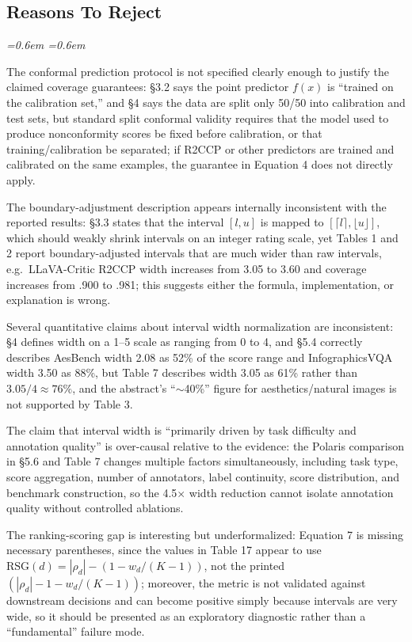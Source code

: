 \documentclass[10pt]{article}
\newenvironment{reviewerquote}{%
  \par\addvspace{0.25ex}\begingroup
  \footnotesize\itshape
  \leftskip=0.6em \rightskip=0.6em
  \color{black!78}
  \setlength{\parskip}{0.35ex plus 0.1ex}
}{%
  \endgroup\par\addvspace{0.25ex}
}
\begin{document}
\subsection*{Reasons To Reject}
\begin{reviewerquote}
The conformal prediction protocol is not specified clearly enough to justify the claimed coverage guarantees: \S 3.2 says the point predictor $f(x)$ is ``trained on the calibration set,'' and \S 4 says the data are split only 50/50 into calibration and test sets, but standard split conformal validity requires that the model used to produce nonconformity scores be fixed before calibration, or that training/calibration be separated; if R2CCP or other predictors are trained and calibrated on the same examples, the guarantee in Equation 4 does not directly apply.

The boundary-adjustment description appears internally inconsistent with the reported results: \S 3.3 states that the interval $[l,u]$ is mapped to $[\lceil l\rceil, \lfloor u\rfloor]$, which should weakly shrink intervals on an integer rating scale, yet Tables 1 and 2 report boundary-adjusted intervals that are much wider than raw intervals, e.g.\ LLaVA-Critic R2CCP width increases from 3.05 to 3.60 and coverage increases from .900 to .981; this suggests either the formula, implementation, or explanation is wrong.

Several quantitative claims about interval width normalization are inconsistent: \S 4 defines width on a 1--5 scale as ranging from 0 to 4, and \S 5.4 correctly describes AesBench width 2.08 as 52\% of the score range and InfographicsVQA width 3.50 as 88\%, but Table 7 describes width 3.05 as 61\% rather than $3.05/4 \approx 76\%$, and the abstract's ``$\sim$40\%'' figure for aesthetics/natural images is not supported by Table 3.

The claim that interval width is ``primarily driven by task difficulty and annotation quality'' is over-causal relative to the evidence: the Polaris comparison in \S 5.6 and Table 7 changes multiple factors simultaneously, including task type, score aggregation, number of annotators, label continuity, score distribution, and benchmark construction, so the 4.5$\times$ width reduction cannot isolate annotation quality without controlled ablations.

The ranking-scoring gap is interesting but underformalized: Equation 7 is missing necessary parentheses, since the values in Table 17 appear to use $\mathrm{RSG}(d) = |\rho_d| - (1 - w_d/(K-1))$, not the printed $(|\rho_d| - 1 - w_d/(K-1))$; moreover, the metric is not validated against downstream decisions and can become positive simply because intervals are very wide, so it should be presented as an exploratory diagnostic rather than a ``fundamental'' failure mode.
\end{reviewerquote}
\end{document}
